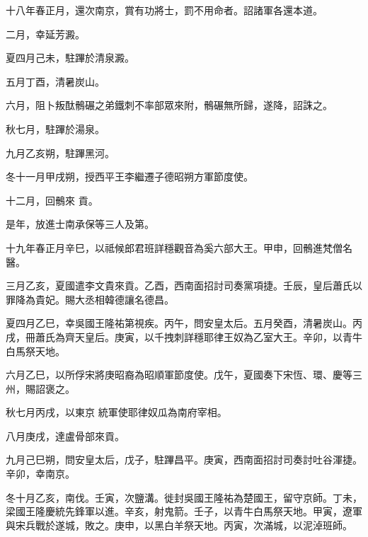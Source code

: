 \begin{pinyinscope}
 十八年春正月，還次南京，賞有功將士，罰不用命者。詔諸軍各還本道。



 二月，幸延芳澱。



 夏四月己未，駐蹕於清泉澱。



 五月丁酉，清暑炭山。



 六月，阻卜叛酞鶻碾之弟鐵刺不率部眾來附，鶻碾無所歸，遂降，詔誅之。



 秋七月，駐蹕於湯泉。



 九月乙亥朔，駐蹕黑河。



 冬十一月甲戌朔，授西平王李繼遷子德昭朔方軍節度使。



 十二月，回鶻來
 貢。



 是年，放進士南承保等三人及第。



 十九年春正月辛巳，以祗候郎君班詳穩觀音為奚六部大王。甲申，回鶻進梵僧名醫。



 三月乙亥，夏國遣李文貴來貢。乙酉，西南面招討司奏黨項捷。壬辰，皇后蕭氏以罪降為貴妃。賜大丞相韓德讓名德昌。



 夏四月乙巳，幸吳國王隆祐第視疾。丙午，問安皇太后。五月癸酉，清暑炭山。丙戌，冊蕭氏為齊天皇后。庚寅，以千拽刺詳穩耶律王奴為乙室大王。辛卯，以青牛白馬祭天地。



 六月乙巳，以所俘宋將庚昭裔為昭順軍節度使。戊午，夏國奏下宋恆、環、慶等三州，賜詔褒之。



 秋七月丙戌，以東京
 統軍使耶律奴瓜為南府宰相。



 八月庚戌，達盧骨部來貢。



 九月己巳朔，問安皇太后，戊子，駐蹕昌平。庚寅，西南面招討司奏討吐谷渾捷。辛卯，幸南京。



 冬十月乙亥，南伐。壬寅，次鹽溝。徙封吳國王隆祐為楚國王，留守京師。丁未，梁國王隆慶統先鋒軍以進。辛亥，射鬼箭。壬子，以青牛白馬祭天地。甲寅，遼軍與宋兵戰於遂城，敗之。庚申，以黑白羊祭天地。丙寅，次滿城，以泥淖班師。




\end{pinyinscope}
